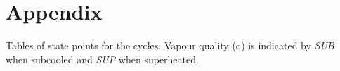 \documentclass[review,3p]{elsarticle}
\begin{document}
\begin{thebibliography}{00}



\end{thebibliography}

\newpage
\section*{Appendix}
Tables of state points for the cycles. Vapour quality (q) is indicated by \emph{SUB} when subcooled and \emph{SUP} when superheated.
\end{document}
